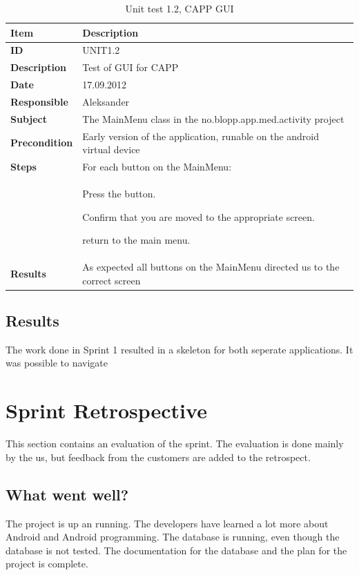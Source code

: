 \begin{table}
	\begin{center}
		\begin{tabular}{|p{3.0cm}|p{14.0cm}|}
			\hline
			\bf{Item} & \bf{Description}\\
			\hline
			\bf{ID} & UNIT1.2\\
			\bf{Description} & Test of GUI for CAPP\\
			\bf{Date} & 17.09.2012\\
			\bf{Responsible} & Aleksander\\
			\bf{Subject} & The MainMenu class in the no.blopp.app.med.activity project\\
			\bf{Precondition} & Early version of the application, runable on the android virtual device\\
			\bf{Steps} & For each button on the MainMenu:\\
			\bf{} &
			\begin{tabulenum}
			\item Press the button.
			\item Confirm that you are moved to the appropriate screen.
			\item return to the main menu.
			\end{tabulenum}\\
			\hline
			\bf{Results} & As expected all buttons on the MainMenu directed us to the correct screen\\
			\hline
		\end{tabular}
	\end{center}
	\caption{Unit test 1.2, CAPP GUI}
	\label{tab:unit1.2}
\end{table}

\subsection{Results}
The work done in Sprint 1 resulted in a skeleton for both seperate applications. It was possible to navigate 

\section{Sprint Retrospective}
\label{sec:sprint1review}
This section contains an evaluation of the sprint. The evaluation is done mainly
 by the us, but feedback from the customers are added to the retrospect.

\subsection*{What went well?}
The project is up an running. The developers have learned a lot more about Android and Android programming.
The database is running, even though the database is not tested. The documentation for the database and the plan for the project is complete.

